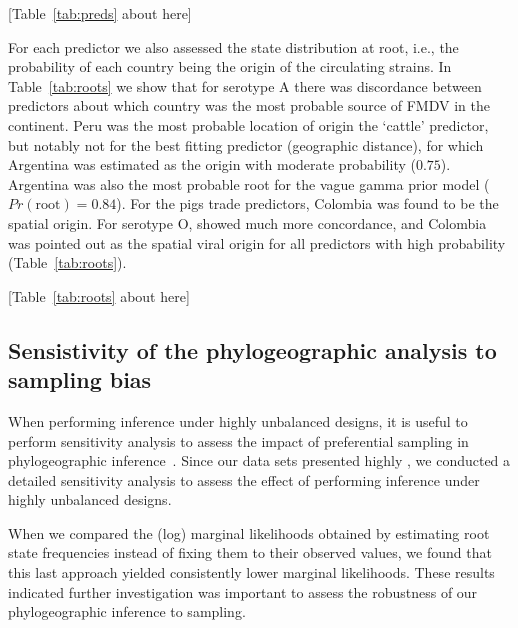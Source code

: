 \documentclass[10pt]{article}
\begin{document}
\begin{center}
 [Table~\ref{tab:preds} about here]
\end{center}

For each predictor we also assessed the state distribution at root, i.e., the probability of each country being the origin of the circulating strains.
In Table~\ref{tab:roots} we show that for serotype A there was discordance between predictors about which country was the most probable source of FMDV in the continent.
Peru was the most probable location of origin the `cattle' predictor, but notably not for the best fitting predictor (geographic distance), for which Argentina was estimated as the origin with moderate probability ($0.75$).
Argentina was also the most probable root for the vague gamma prior model ($Pr(\text{root})=0.84$).
For the pigs trade predictors, Colombia was found to be the spatial origin.
For serotype O, showed much more concordance, and Colombia was pointed out as the spatial viral origin for all predictors with high probability (Table~\ref{tab:roots}).


\begin{center}
 [Table~\ref{tab:roots} about here]
\end{center}

\subsection*{ Sensistivity of the phylogeographic analysis to sampling bias}

When performing inference under highly unbalanced designs, it is useful to perform sensitivity analysis to assess the impact of preferential sampling in phylogeographic inference~\cite{Faria2012,polar,fluPNAS}. 
Since our data sets presented highly , we conducted a detailed sensitivity analysis to assess the effect of performing inference under highly unbalanced designs.

When we compared the (log) marginal likelihoods obtained by estimating root state frequencies instead of fixing them to their observed values, we found that this last approach yielded consistently lower marginal likelihoods.
These results indicated further investigation was important to assess the robustness of our phylogeographic inference to sampling.
\end{document}
